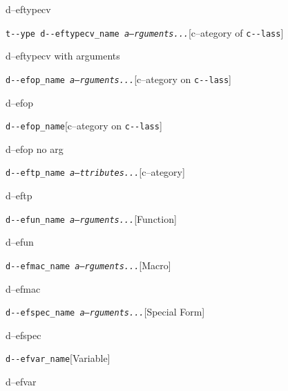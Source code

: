 \documentclass{book}
\begin{document}
%
d--eftypecv

\noindent\texttt{t{-}{-}ype d{-}{-}eftypecv\_name \bgroup{}\normalfont{}\textsl{a--rguments...}\egroup{}}\hfill[c--ategory of \texttt{c{-}{-}lass}]



%
d--eftypecv with arguments

\noindent\texttt{d{-}{-}efop\_name \bgroup{}\normalfont{}\textsl{a--rguments...}\egroup{}}\hfill[c--ategory on \texttt{c{-}{-}lass}]



%
d--efop

\noindent\texttt{d{-}{-}efop\_name}\hfill[c--ategory on \texttt{c{-}{-}lass}]



%
d--efop no arg

\noindent\texttt{d{-}{-}eftp\_name \bgroup{}\normalfont{}\textsl{a--ttributes...}\egroup{}}\hfill[c--ategory]



%
d--eftp

\noindent\texttt{d{-}{-}efun\_name \bgroup{}\normalfont{}\textsl{a--rguments...}\egroup{}}\hfill[Function]



%
d--efun

\noindent\texttt{d{-}{-}efmac\_name \bgroup{}\normalfont{}\textsl{a--rguments...}\egroup{}}\hfill[Macro]



%
d--efmac

\noindent\texttt{d{-}{-}efspec\_name \bgroup{}\normalfont{}\textsl{a--rguments...}\egroup{}}\hfill[Special Form]



%
d--efspec

\noindent\texttt{d{-}{-}efvar\_name}\hfill[Variable]



%
d--efvar
\end{document}
